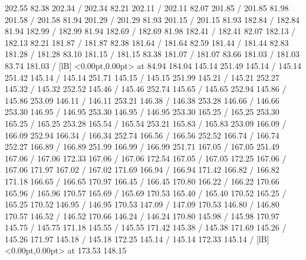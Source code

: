 \documentclass[12pt,a4paper]{report}
\begin{document}
{ 202.55 82.38 202.34 /
 202.34 82.21 202.11 /
 202.11 82.07 201.85 /
 201.85 81.98 201.58 /
 201.58 81.94 201.29 /
 201.29 81.93 201.15 /
 201.15 81.93 182.84 /
 182.84 81.94 182.99 /
 182.99 81.94 182.69 /
 182.69 81.98 182.41 /
 182.41 82.07 182.13 /
 182.13 82.21 181.87 /
 181.87 82.38 181.64 /
 181.64 82.59 181.44 /
 181.44 82.83 181.28 /
 181.28 83.10 181.15 /
 181.15 83.38 181.07 /
 181.07 83.66 181.03 /
 181.03 83.74 181.03 /
  [lB] <0.00pt,0.00pt> at 84.94 184.04
\setsolid
{} 145.14 251.49 145.14 /
 145.14 251.42 145.14 /
 145.14 251.71 145.15 /
 145.15 251.99 145.21 /
 145.21 252.27 145.32 /
 145.32 252.52 145.46 /
 145.46 252.74 145.65 /
 145.65 252.94 145.86 /
 145.86 253.09 146.11 /
 146.11 253.21 146.38 /
 146.38 253.28 146.66 /
 146.66 253.30 146.95 /
 146.95 253.30 146.95 /
 146.95 253.30 165.25 /
 165.25 253.30 165.25 /
 165.25 253.28 165.54 /
 165.54 253.21 165.83 /
 165.83 253.09 166.09 /
 166.09 252.94 166.34 /
 166.34 252.74 166.56 /
 166.56 252.52 166.74 /
 166.74 252.27 166.89 /
 166.89 251.99 166.99 /
 166.99 251.71 167.05 /
 167.05 251.49 167.06 /
 167.06 172.33 167.06 /
 167.06 172.54 167.05 /
 167.05 172.25 167.06 /
 167.06 171.97 167.02 /
 167.02 171.69 166.94 /
 166.94 171.42 166.82 /
 166.82 171.18 166.65 /
 166.65 170.97 166.45 /
 166.45 170.80 166.22 /
 166.22 170.66 165.96 /
 165.96 170.57 165.69 /
 165.69 170.53 165.40 /
 165.40 170.52 165.25 /
 165.25 170.52 146.95 /
 146.95 170.53 147.09 /
 147.09 170.53 146.80 /
 146.80 170.57 146.52 /
 146.52 170.66 146.24 /
 146.24 170.80 145.98 /
 145.98 170.97 145.75 /
 145.75 171.18 145.55 /
 145.55 171.42 145.38 /
 145.38 171.69 145.26 /
 145.26 171.97 145.18 /
 145.18 172.25 145.14 /
 145.14 172.33 145.14 /
  [lB] <0.00pt,0.00pt> at 173.53 148.15
}
\end{document}
